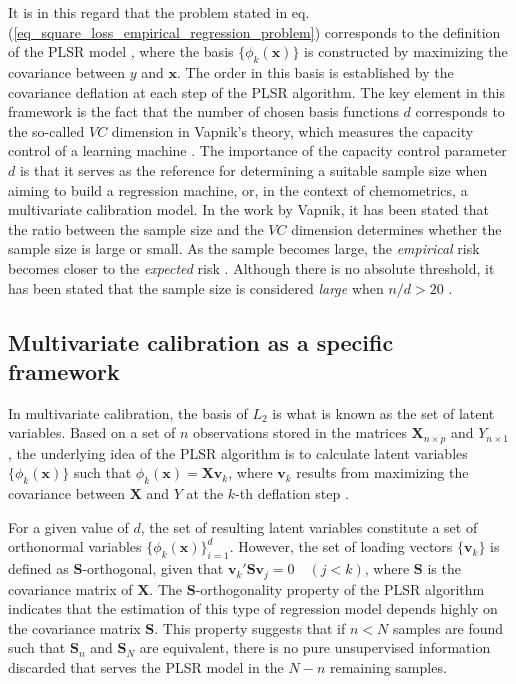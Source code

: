 \documentclass[journal=ancham,manuscript=article]{achemso}
\begin{document}
It is in this regard that the problem stated in eq. (\ref{eq_square_loss_empirical_regression_problem}) corresponds to the definition of the PLSR model  \cite{Stone1990}, where the basis $\{\phi_{k}(\mathbf{x})\}$ is constructed by maximizing the covariance between $y$ and $\mathbf{x}$. The order in this basis is established by the covariance deflation at each step of the PLSR algorithm. The key element in this framework is the fact that the number of chosen basis functions $d$ corresponds to the so-called $VC$ dimension in Vapnik's theory, which measures the capacity control of a learning machine \cite{Vapnik2019}. The importance of the capacity control parameter $d$ is that it serves as the reference for determining a suitable sample size when aiming to build a regression machine, or, in the context of chemometrics, a multivariate calibration model. In the work by Vapnik, it has been stated that the ratio between the sample size and the $VC$ dimension determines whether the sample size is large or small. As the sample becomes large, the \emph{empirical} risk becomes closer to the \emph{expected} risk \cite{Vapnik2000}. Although there is no absolute threshold, it has been stated that the sample size is considered \emph{large} when  $n/d>20$ \cite{Vapnik2000}.


\subsection{Multivariate calibration as a specific framework}

In multivariate calibration, the basis of $L_2$ is what is known as the set of latent variables. Based on a set of $n$ observations stored in the matrices $\mathbf{X}_{n\times p}$ and $Y_{n\times 1}$, the underlying idea of the PLSR algorithm is to calculate latent variables $\{\phi_{k}(\mathbf{x})\}$ such that $\phi_k(\mathbf{x}) = \mathbf{Xv}_{k}$, where $\mathbf{v}_k$ results from maximizing the covariance between $\mathbf{X}$ and $Y$ at the $k$-th deflation step \cite{DeJong1993}. 

For a given value of $d$, the set of resulting latent variables constitute a set of orthonormal variables $\{\phi_{k}(\mathbf{x})\}_{i=1}^d$. However, the set of loading vectors $\{\mathbf{v}_k\}$ is defined as $\mathbf{S}$-orthogonal, given that $\mathbf{v}_k'\mathbf{S}\mathbf{v}_j = 0 \quad (j<k)$, where $\mathbf{S}$ is the covariance matrix of $\mathbf{X}$. The $\mathbf{S}$-orthogonality property of the PLSR algorithm indicates that the estimation of this type of regression model depends highly on the covariance matrix $\mathbf{S}$. This property suggests that if $n<N$ samples are found such that $\mathbf{S}_n$ and $\mathbf{S}_N$ are equivalent, there is no pure unsupervised information discarded that serves the PLSR model in the $N-n$ remaining samples.
\end{document}
